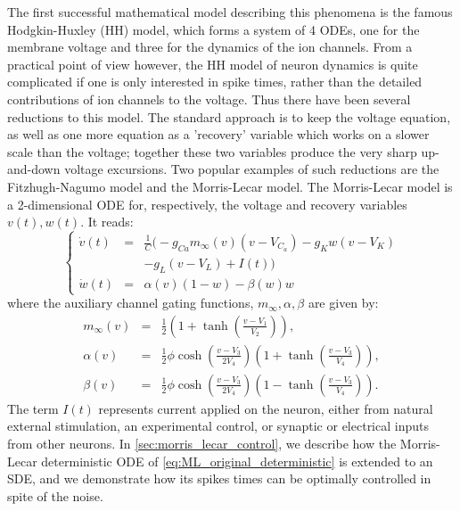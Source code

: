  The first successful mathematical model describing this
 phenomena is the famous Hodgkin-Huxley (HH) model, which forms a system of 4
 ODEs, one for the membrane voltage and three for the dynamics of the ion
 channels. From a practical point of view however, the HH model of
neuron dynamics is quite complicated if one is only interested in spike times,
 rather than the detailed contributions of ion channels to the voltage. Thus there have been several
 reductions to this model. The standard approach is to keep the voltage equation, 
 as well as one more equation as a 'recovery' variable which works on a slower
 scale than the voltage; together these two variables produce the very sharp up-and-down voltage
 excursions. Two popular examples of such reductions are the Fitzhugh-Nagumo
 model and the Morris-Lecar model. The Morris-Lecar model
 is a 2-dimensional ODE for, respectively, the voltage and recovery variables $v(t), w(t)$. It reads:
\begin{equation}
\left\{
\begin{array}{ccl}
\dot{v}(t)  &=& \frac{1}{C}\Big(-g_{Ca}m_\infty(v) (v-V_{C_a}) -
g_K w (v-V_K) \\ && 
-g_L(v-V_L)+I(t)  \Big) \\
\dot{w}(t)&=& \alpha(v)(1-w) - \beta(w)w
\end{array}
\right.
\label{eq:ML_original_deterministic}
\end{equation}
where the auxiliary channel gating functions, $m_\infty, \alpha, \beta$ are given by:
\begin{eqnarray*}
m_\infty(v)&=&\frac{1}{2}\left(1+\tanh\left(\frac{v-V_1}{V_2}\right)\right),\\
\alpha(v) &=& \frac{1}{2}\phi \cosh\left(\frac{v-V_3}{2V_4}\right)\left(1+\tanh\left(\frac{v-V_3}{V_4}\right)\right),\\
\beta(v) &=& \frac{1}{2}\phi \cosh\left(\frac{v-V_3}{2V_4}\right)\left(1-\tanh\left(\frac{v-V_3}{V_4}\right)\right).
\end{eqnarray*} 
The term $I(t)$ represents current applied on the neuron, either from natural
external stimulation, an experimental control, or synaptic or electrical inputs from other neurons. 
In \cref{sec:morris_lecar_control}, we describe how the Morris-Lecar
deterministic ODE of \cref{eq:ML_original_deterministic} is extended to an SDE, and we demonstrate how its spikes times can be optimally controlled in spite of the noise.
 
